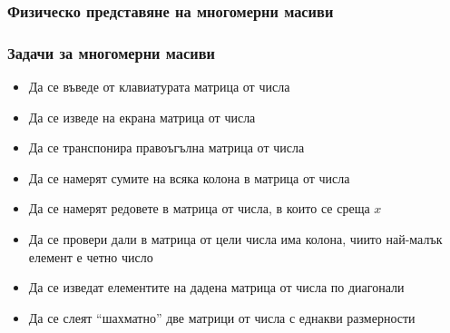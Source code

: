 \documentclass[alsotrans]{beamerswitch}
\begin{document}
\begin{frame}
  \frametitle{Физическо представяне на многомерни масиви}

  \begin{center}
  \end{center}
\end{frame}

\begin{frame}
  \frametitle{Задачи за многомерни масиви}

  \begin{itemize}[<+->]
  \item Да се въведе от клавиатурата матрица от числа
  \item Да се изведе на екрана матрица от числа
  \item Да се транспонира правоъгълна матрица от числа
  \item Да се намерят сумите на всяка колона в матрица от числа
  \item Да се намерят редовете в матрица от числа, в които се среща $x$
  \item Да се провери дали в матрица от цели числа има колона, чиито най-малък елемент е четно число
  \item Да се изведат елементите на дадена матрица от числа по диагонали
  \item Да се слеят ``шахматно'' две матрици от числа с еднакви размерности
  \end{itemize}
\end{frame}
\end{document}

